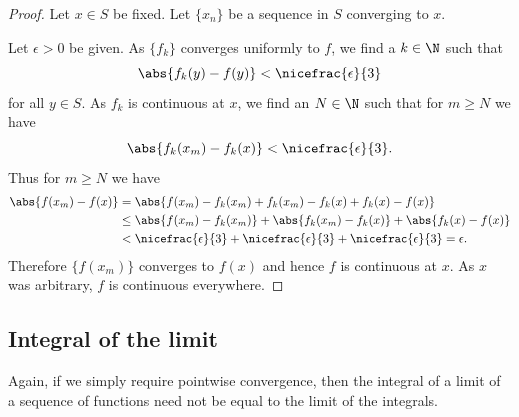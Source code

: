 \documentclass[12pt]{book}
\begin{document}
\begin{proof}
Let $x \in S$ be fixed.
Let $\{ x_n \}$ be a sequence in $S$
converging to $x$.

Let $\epsilon > 0$ be given.
As $\{ f_k \}$ converges uniformly to $f$, we find a $k \in \N$ such that
\begin{equation*}
\abs{f_k(y)-f(y)} < \nicefrac{\epsilon}{3}
\end{equation*}
for all $y \in S$.
As $f_k$ is continuous at $x$,
we find an $N \in \N$ such that for $m \geq N$
we have 
\begin{equation*}
\abs{f_k(x_m)-f_k(x)} < \nicefrac{\epsilon}{3} .
\end{equation*}
Thus for
$m \geq N$ we have
\begin{equation*}
\begin{split}
\abs{f(x_m)-f(x)}
& =
\abs{f(x_m)-f_k(x_m)+f_k(x_m)-f_k(x)+f_k(x)-f(x)}
\\
& \leq
\abs{f(x_m)-f_k(x_m)}+
\abs{f_k(x_m)-f_k(x)}+
\abs{f_k(x)-f(x)}
\\
& <
\nicefrac{\epsilon}{3} +
\nicefrac{\epsilon}{3} +
\nicefrac{\epsilon}{3} = \epsilon .
\end{split}
\end{equation*}
Therefore $\{ f(x_m) \}$ converges to $f(x)$ and hence $f$ is continuous at
$x$.
As $x$ was arbitrary, $f$ is continuous everywhere.
\end{proof}

\subsection*{Integral of the limit}

Again, if we simply require pointwise convergence, then the integral
of a limit of a sequence of functions need not be equal to the limit
of the integrals.
\end{document}

